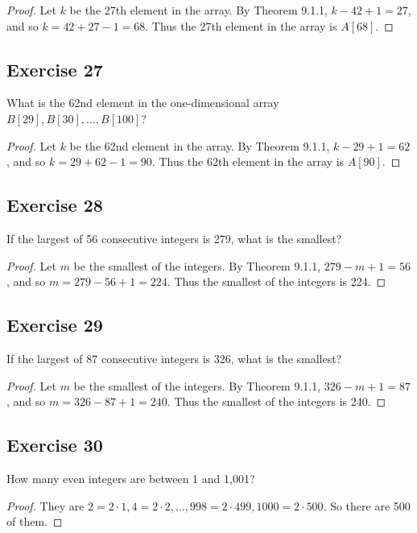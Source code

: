 \documentclass[14pt]{extarticle}
\begin{document}
\begin{proof}
Let $k$ be the 27th element in the array. By Theorem 9.1.1, \(k - 42 + 1 = 27\), and so \(k = 42 + 27 - 1 = 68\). 
Thus the 27th element in the array is \(A[68]\).
\end{proof}

\subsection{Exercise 27}
What is the 62nd element in the one-dimensional array \(B[29], B[30], \ldots, B[100]\)?

\begin{proof}
Let $k$ be the 62nd element in the array. By Theorem 9.1.1, \(k - 29 + 1 = 62\), and so \(k = 29 + 62 - 1 = 90\). 
Thus the 62th element in the array is \(A[90]\).
\end{proof}

\subsection{Exercise 28}
If the largest of 56 consecutive integers is 279, what is the smallest?

\begin{proof}
Let $m$ be the smallest of the integers. By Theorem 9.1.1, \(279 - m + 1 = 56\), and so \(m = 279 - 56 + 1 = 224\). 
Thus the smallest of the integers is 224.
\end{proof}

\subsection{Exercise 29}
If the largest of 87 consecutive integers is 326, what is the smallest?

\begin{proof}
Let $m$ be the smallest of the integers. By Theorem 9.1.1, \(326 - m + 1 = 87\), and so \(m = 326 - 87 + 1 = 240\). 
Thus the smallest of the integers is 240.
\end{proof}

\subsection{Exercise 30}
How many even integers are between 1 and 1,001?

\begin{proof}
They are \(2 = 2 \cdot 1, 4 = 2 \cdot 2, \ldots, 998 = 2 \cdot 499, 1000 = 2 \cdot 500\). So there are 500 of them.
\end{proof}
\end{document}
